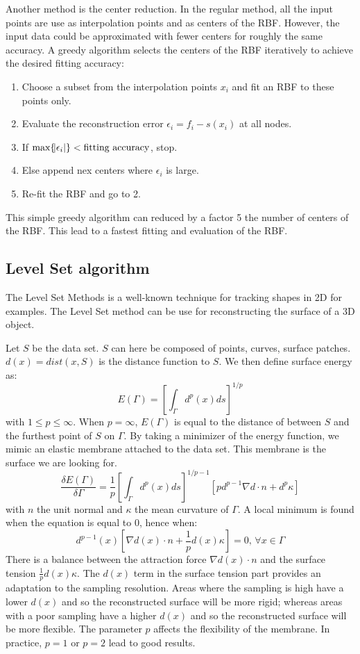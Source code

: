 \documentclass[a4paper]{article}
\begin{document}
Another method is the center reduction. In the regular method, all the input points are use as interpolation points and as centers of the RBF. However, the input data could be approximated with fewer centers for roughly the same accuracy. A greedy algorithm selects the centers of the RBF iteratively to achieve the desired fitting accuracy:
\begin{enumerate}
\item Choose a subset from the interpolation points $x_i$ and fit an RBF to these points only.
\item Evaluate the reconstruction error $\epsilon_i = f_i - s(x_i)$ at all nodes.
\item If $\text{max}\{\abs{\epsilon_i}\} < \text{fitting accuracy}$, stop.
\item Else append nex centers where $\epsilon_i$ is large.
\item Re-fit the RBF and go to 2.
\end{enumerate}
This simple greedy algorithm can reduced by a factor 5 the number of centers of the RBF. This lead to a fastest fitting and evaluation of the RBF.

\subsection{Level Set algorithm}
The Level Set Methods is a well-known technique for tracking shapes in 2D for examples. The Level Set method can be use for reconstructing the surface of a 3D object.

Let $S$ be the data set. $S$ can here be composed of points, curves, surface patches. $d(x) = dist(x,S)$ is the distance function to $S$. We then define surface energy as:
$$E(\Gamma) = \left[\int_{\Gamma} d^p(x)ds\right]^{1/p}$$
with $1 \le p \le \infty$. When $p = \infty$, $E(\Gamma)$ is equal to the distance of between $S$ and the furthest point of $S$ on $\Gamma$. By taking a minimizer of the energy function, we mimic an elastic membrane attached to the data set. This membrane is the surface we are looking for.
$$\frac{\delta E(\Gamma)}{\delta\Gamma} = \frac{1}{p}\left[\int_{\Gamma} d^p(x)ds\right]^{1/p - 1}[pd^{p-1}\nabla d \cdot n +d^p\kappa]$$
with $n$ the unit normal and $\kappa$ the mean curvature of $\Gamma$. A local minimum is found when the equation is equal to 0, hence when:
$$d^{p-1}(x)[\nabla d(x) \cdot n + \frac{1}{p}d(x)\kappa] = 0\text{, }\forall x\in\Gamma$$
There is a balance between the attraction force $\nabla d(x) \cdot n$ and the surface tension $\frac{1}{p}d(x)\kappa$. The $d(x)$ term in the surface tension part provides an adaptation to the sampling resolution. Areas where the sampling is high have a lower $d(x)$ and so the reconstructed surface will be more rigid; whereas areas with a poor sampling have a higher $d(x)$ and so the reconstructed surface will be more flexible. The parameter $p$ affects the flexibility of the membrane. In practice, $p = 1$ or $p = 2$ lead to good results.
\end{document}
